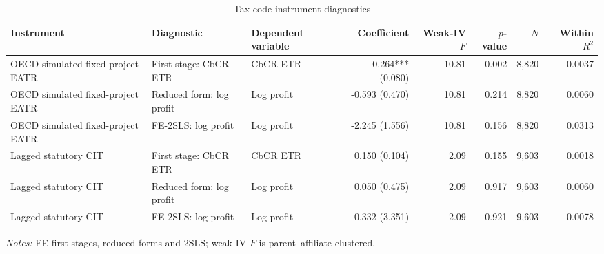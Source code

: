 \begin{table}[H]
\centering
\scriptsize
\setlength{\tabcolsep}{2pt}
\caption[Tax-code instrument diagnostics]{Tax-code instrument diagnostics}
\label{tab:stage3_iv_diagnostics}
\begin{adjustbox}{max width=\textwidth,center}
\begin{tabular}{@{}lllrrrrr@{}}
\toprule
Instrument & Diagnostic & Dependent variable & Coefficient & Weak-IV $F$ & $p$-value & $N$ & Within $R^2$ \\
\midrule
OECD simulated fixed-project EATR & First stage: CbCR ETR & CbCR ETR &  0.264*** (0.080) & 10.81 & 0.002 & 8,820 &  0.0037 \\
OECD simulated fixed-project EATR & Reduced form: log profit & Log profit & -0.593 (0.470) & 10.81 & 0.214 & 8,820 &  0.0060 \\
OECD simulated fixed-project EATR & FE-2SLS: log profit & Log profit & -2.245 (1.556) & 10.81 & 0.156 & 8,820 &  0.0313 \\
Lagged statutory CIT & First stage: CbCR ETR & CbCR ETR &  0.150 (0.104) &  2.09 & 0.155 & 9,603 &  0.0018 \\
Lagged statutory CIT & Reduced form: log profit & Log profit &  0.050 (0.475) &  2.09 & 0.917 & 9,603 &  0.0060 \\
Lagged statutory CIT & FE-2SLS: log profit & Log profit &  0.332 (3.351) &  2.09 & 0.921 & 9,603 & -0.0078 \\
\bottomrule
\end{tabular}
\end{adjustbox}

\vspace{0.35em}
\noindent\begin{minipage}{\textwidth}
\footnotesize\raggedright\textit{Notes:} FE first stages, reduced forms and 2SLS; weak-IV $F$ is parent--affiliate clustered.
\end{minipage}
\end{table}
